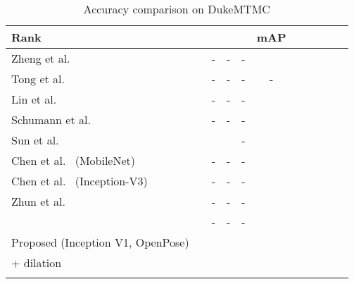 \documentclass{llncs}
\begin{document}
\begin{table}[t]
\setlength{\tabcolsep}{5pt}
\centering
\caption{\small Accuracy comparison on DukeMTMC}\vspace{-.3cm}
\label{table:result_duke}
\resizebox{0.70\linewidth}{!}
{
\begin{tabular}{|l| |Sc|Sc|Sc|Sc|Sc|}
\hline
Rank &  &  &  &  & mAP\\
\hline\hline
Zheng et al.~\cite{conf/iccv/zheng17} &  & -& -& -& \\
Tong et al.~\cite{conf/cvpr/xiao17} &  & -& -& -& -\\
Lin et al.~\cite{journal/arxiv/lin17} &  & -& -& -& \\
Schumann et al.~\cite{conf/cvprw/schumann17} &  & -& -& -& \\
Sun et al.~\cite{conf/iccv/sun17} &  &  & & -& \\
Chen et al.~\cite{conf/cvpr/chen17} (MobileNet) &  & -& -& -& \\
Chen et al.~\cite{conf/cvpr/chen17} (Inception-V3) &  & -& -& -& \\
Zhun et al.~\cite{journal/arxiv/zhong17} &  &- & -& -& \\
\quad{} & {\color{blue} } & {\color{blue} -}& {\color{blue} -} & {\color{blue} -} & {\color{blue} }\\
\hline
Proposed (Inception V1, OpenPose)&  &  &  &  & \\
\quad\quad + dilation&  &  &  &  & \\
\quad{} & {\color{blue}} & {\color{blue}} & {\color{blue}} & {\color{blue}} & {\color{blue}} \\
\hline
\end{tabular}}\vspace{-.3cm}
\end{table}
\end{document}
